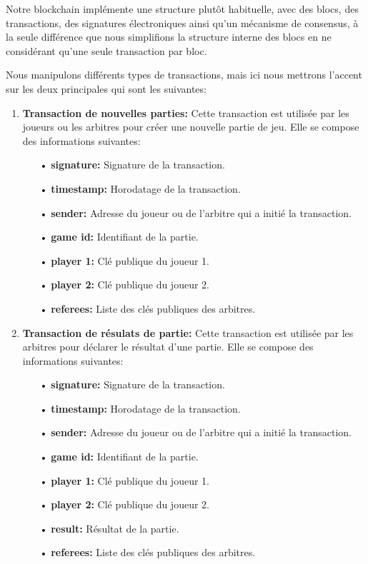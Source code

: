 \documentclass[journal, a4paper]{IEEEtran}
\begin{document}
			Notre blockchain implémente une structure plutôt habituelle, avec des blocs, des transactions,
		des signatures électroniques ainsi qu'un mécanisme de consensus, à la seule différence que nous simplifions la structure
		interne des blocs en ne considérant qu'une seule transaction par bloc.

		Nous manipulons différents types de transactions, mais ici nous mettrons l'accent sur les deux principales qui sont les suivantes:
			\begin{enumerate}
				\item \textbf{Transaction de nouvelles parties:} Cette transaction est utilisée par les joueurs ou les arbitres  pour créer une nouvelle partie de jeu.
					Elle se compose des informations suivantes:
					\begin{itemize}
						\item[•] \textbf{signature:} Signature de la transaction.
						\item[•] \textbf{timestamp:} Horodatage de la transaction.
						\item[•] \textbf{sender:} Adresse du joueur ou de l'arbitre qui a initié la transaction.
						\item[•] \textbf{game id:} Identifiant de la partie.
						\item[•] \textbf{player 1:} Clé publique du joueur 1.
						\item[•] \textbf{player 2:} Clé publique du joueur 2.
						\item[•] \textbf{referees:} Liste des clés publiques des arbitres.
					\end{itemize}

				\item \textbf{Transaction de résulats de partie:} Cette transaction est utilisée par les arbitres pour déclarer le résultat d'une partie.
					Elle se compose des informations suivantes:
				    \begin{itemize}
						\item[•] \textbf{signature:} Signature de la transaction.
						\item[•] \textbf{timestamp:} Horodatage de la transaction.
						\item[•] \textbf{sender:} Adresse du joueur ou de l'arbitre qui a initié la transaction.
						\item[•] \textbf{game id:} Identifiant de la partie.
						\item[•] \textbf{player 1:} Clé publique du joueur 1.
						\item[•] \textbf{player 2:} Clé publique du joueur 2.
						\item[•] \textbf{result:} Résultat de la partie.
						\item[•] \textbf{referees:} Liste des clés publiques des arbitres.
					\end{itemize}
			\end{enumerate}
\end{document}
